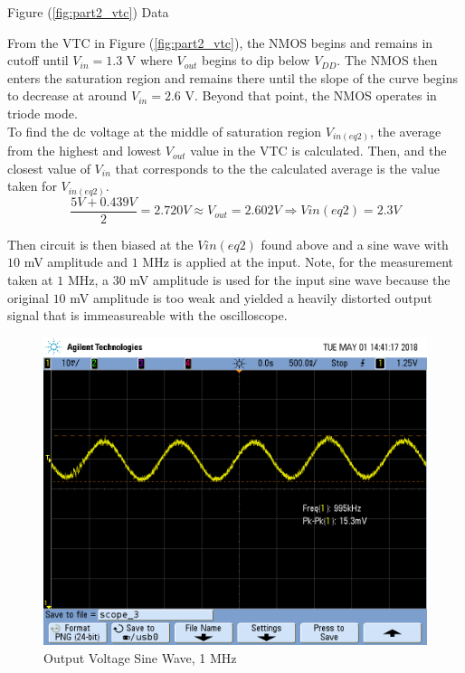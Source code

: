 \FloatBarrier

\begin{table}[h!]
	\centering
	\caption{Figure (\ref{fig:part2_vtc}) Data}
	\label{tab:part2_vtc}
\end{table}

\FloatBarrier

From the VTC in Figure (\ref{fig:part2_vtc}), the NMOS begins and remains in cutoff until $V_{in} = 1.3$ \si{\volt} where $V_{out}$ begins to dip below $V_{DD}$.
The NMOS then enters the saturation region and remains there until the slope of the curve begins to decrease at around $V_{in} = 2.6$ \si{\volt}.
Beyond that point, the NMOS operates in triode mode. \\

To find the dc voltage at the middle of saturation region $V_{in(eq2)}$, the average from the highest and lowest $V_{out}$ value in the VTC is calculated.
Then, and the closest value of $V_{in}$ that corresponds to the the calculated average is the value taken for $V_{in(eq2)}$. \\

\begin{equation}
	\label{eq:v_in_eq2}
	\frac{5 V + 0.439 V}{2} = 2.720 V \approx V_{out} = 2.602 V \Rightarrow V{in(eq2)} = 2.3 V
\end{equation}

Then circuit is then biased at the $V{in(eq2)}$ found above and a sine wave with $10$ \si{\milli\volt} amplitude and $1$ \si{\mega\hertz} is applied at the input. Note, for the measurement taken at $1$ \si{\mega\hertz}, a $30$ \si{\milli\volt} amplitude is used for the input sine wave because the original $10$ \si{\milli\volt} amplitude is too weak and yielded a heavily distorted output signal that is immeasureable with the oscilloscope.

\FloatBarrier

\begin{figure}[h!]
	\centering
	\includegraphics[scale=0.3]{./images/SCOPE_3.PNG}
	\caption{Output Voltage Sine Wave, 1 \si{\mega\hertz}}
	\label{fig:1mhz_original}
\end{figure}


